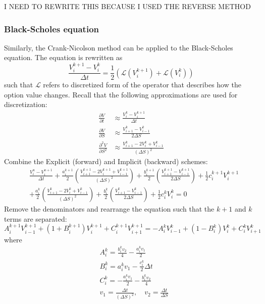 I NEED TO REWRITE THIS BECAUSE I USED THE REVERSE METHOD
\subsubsection{Black-Scholes equation}
Similarly, the Crank-Nicolson method can be applied to the Black-Scholes equation. The equation is rewritten as 
\begin{equation}
    \frac{V_i^{k+1} - V_i^k}{\Delta t} = \frac{1}{2} \left( \mathcal{L}(V_i^{k+1}) + \mathcal{L}(V_i^k) \right)
\end{equation}
such that $\mathcal{L}$ refers to discretized form of the operator that describes how the option value changes. Recall that the following approximations are used for discretization:
\begin{align}
    \frac{\partial V}{\partial t} &\approx \frac{V_i^k - V_i^{k+1}}{\Delta t} \tag{Theta} \\
    \frac{\partial V}{\partial S} &\approx \frac{V_{i+1}^k - V_{i-1}^k}{2 \Delta S} \tag{Delta} \\
    \frac{\partial^2 V}{\partial S^2} &\approx \frac{V_{i+1}^k - 2V_i^k + V_{i-1}^k}{(\Delta S)^2} \tag{Gamma}
 \end{align}
Combine the Explicit (forward) and Implicit (backward) schemes: 
\[
\begin{aligned}
    &\frac{V_i^n - V_i^{n+1}}{\Delta t} + \frac{a_i^{k+1}}{2} \left( \frac{V_{i+1}^{k+1} - 2 V_i^{k+1} + V_{i-1}^{k+1}}{(\Delta S)^2} \right) + \frac{b_i^{k+1}}{2} \left( \frac{V_{i+1}^{k+1} - V_{i-1}^{k+1}}{2 \Delta S} \right) + \frac{1}{2} c_i^{k+1} V_i^{k+1} \\
    &+ \frac{a_i^{k}}{2} \left( \frac{V_{i+1}^{k} - 2 V_i^{k} + V_{i-1}^{k}}{(\Delta S)^2} \right) + \frac{b_i^{k}}{2} \left( \frac{V_{i+1}^{k} - V_{i-1}^{k}}{2 \Delta S} \right) + \frac{1}{2} c_i^{k} V_i^{k} = 0
\end{aligned}
\]
Remove the denominators and rearrange the equation such that the $k+1$ and $k$ terms are separated:
\[
    A_i^{k+1} V_{i-1}^{k+1} + (1+B_i^{k+1})V_i^{k+1} + C_i^{k+1} V_{i+1}^{k+1} = -A_i^k V_{i-1}^{k} + (1-B_i^{k})V_i^{k} + C_i^{k} V_{i+1}^k
\]
where
\begin{align*}
    &A_i^k = \frac{b_i^k v_2}{4} - \frac{a_i^k v_1}{2} \\
    &B_i^k = a_i^k v_1 - \frac{c_i^k}{2} \Delta t \\
    &C_i^k = - \frac{a_i^k v_1}{2} -\frac{b_i^k v_2}{4} \\
    &v_1 = \frac{\Delta t}{(\Delta S)^2}, \quad v_2 = \frac{\Delta t}{\Delta S}
\end{align*}

